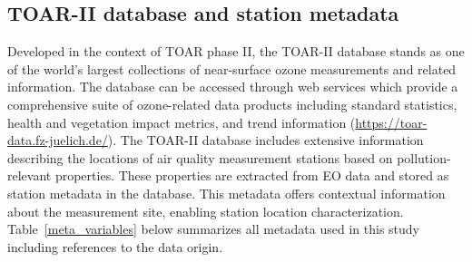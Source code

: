 \documentclass[gmd, manuscript]{copernicus}
\begin{document}
\subsection{TOAR-II database and station metadata}
Developed in the context of TOAR phase II, the TOAR-II database stands as one of the world's largest collections of near-surface ozone measurements and related information. The database can be accessed through web services which provide a comprehensive suite of ozone-related data products including standard statistics, health and vegetation impact metrics, and trend information (\href{https://toar-data.fz-juelich.de/}{https://toar-data.fz-juelich.de/}). The TOAR-II database includes extensive information describing the locations of air quality measurement stations based on pollution-relevant properties. These properties are extracted from EO data and stored as station metadata in the database. This metadata offers contextual information about the measurement site, enabling station location characterization. Table~\ref{meta_variables} below summarizes all metadata used in this study including references to the data origin.
\end{document}
